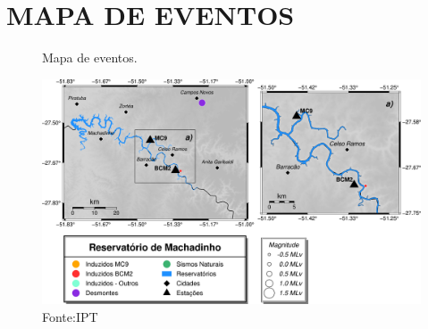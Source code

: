 \section{MAPA DE EVENTOS}
\label{sec:mapa}
\begin{figure}[ht]
    \centering
	\captionsetup{justification=raggedright, singlelinecheck=false, width=1\textwidth}
    \caption{Mapa de eventos.}
    \includegraphics[width=1.0\textwidth]{figuras/mapaevents.png} %
    \caption*{Fonte:IPT}
\end{figure}
